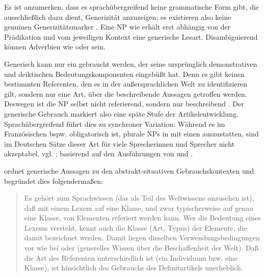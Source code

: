 Es ist anzumerken, dass es sprachübergreifend keine grammatische Form gibt, die ausschließlich dazu dient, Generizität  anzuzeigen; es existieren also keine genuinen Generizitätsmarker \parencite[190]{Gerstner-Link1995}. Eine NP  wie  erhält erst abhängig von der Prädikation und vom jeweiligen Kontext eine generische  Lesart. Disambiguierend können Adverbien  wie  oder  sein. 

Generisch  kann nur ein  gebraucht werden, der seine ursprünglich demonstrativen und deiktischen Bedeutungskomponenten eingebüßt hat. Denn es gibt keinen bestimmten Referenten, den es in der außersprachlichen Welt zu identifizieren gilt, sondern nur eine Art, über die beschreibende Aussagen getroffen werden. Deswegen ist die NP  selbst nicht referierend, sondern nur beschreibend \parencite[297]{Bluhdorn2008}. Der generische  Gebrauch markiert also eine späte Stufe der Artikelentwicklung. Sprachübergreifend führt dies zu synchroner Variation: Während es im Französischen bspw. obligatorisch ist, plurale  NPs  in  mit einen  auszustatten, sind im Deutschen Sätze dieser Art für viele Sprecherinnen und Sprecher nicht akzeptabel, vgl. ; basierend auf den Ausführungen von \textcite{Lyons1999} und \textcite{Barton2016}.

\begin{exe}
	\ex \label{ex:gener2} 
	\begin{xlist}
		\end{xlist}
\end{exe}

\textcite{Himmelmann1997} ordnet generische  Aussagen zu den abstrakt-situativen  Gebrauchskontexten und begründet dies folgendermaßen: \blockcquote[37]{Himmelmann1997}{Es gehört zum Sprachwissen (das als Teil des Weltwissens anzusehen ist), daß mit einem Lexem auf eine Klasse, und zwar typischerweise auf genau eine Klasse, von Elementen referiert werden kann. Wer die Bedeutung eines Lexems versteht, kennt auch die Klasse (Art, Typus) der Elemente, die damit bezeichnet werden. Damit liegen dieselben Verwendungsbedingungen vor wie bei  oder  (generelles Wissen über die Beschaffenheit der Welt). Daß die Art des Referenten unterschiedlich ist (ein Individuum bzw. eine Klasse), ist hinsichtlich des Gebrauchs des Definitartikels unerheblich.}

